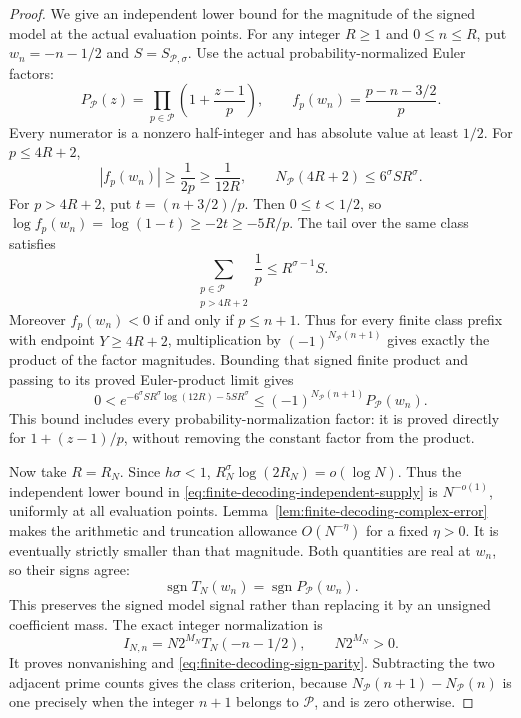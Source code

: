 \documentclass[11pt]{article}
\theoremstyle{definition}
\begin{document}
\begin{proof}
We give an independent lower bound for the magnitude of the
signed model at the actual evaluation points.
For any integer $R\ge1$ and $0\le n\le R$, put
$w_n=-n-1/2$ and $S=S_{\mathcal P,\sigma}$.
Use the actual probability-normalized Euler factors:
\[
 P_{\mathcal P}(z)=\prod_{p\in\mathcal P}
                 \left(1+\frac{z-1}{p}\right),\qquad
 f_p(w_n)=\frac{p-n-3/2}{p}.
\]
Every numerator is a nonzero half-integer and has absolute value
at least $1/2$. For $p\le4R+2$,
\[
 |f_p(w_n)|\ge\frac1{2p}\ge\frac1{12R},\qquad
 N_{\mathcal P}(4R+2)\le6^\sigma SR^\sigma .
\]
For $p>4R+2$, put $t=(n+3/2)/p$. Then $0\le t<1/2$, so
$\log f_p(w_n)=\log(1-t)\ge-2t\ge-5R/p$.
The tail over the same class satisfies
\[
 \sum_{\substack{p\in\mathcal P\\p>4R+2}}\frac1p
                            \le R^{\sigma-1}S.
\]
Moreover $f_p(w_n)<0$ if and only if $p\le n+1$.
Thus for every finite class prefix with endpoint $Y\ge4R+2$,
multiplication by $(-1)^{N_{\mathcal P}(n+1)}$ gives exactly the
product of the factor magnitudes. Bounding that signed finite
product and passing to its proved Euler-product limit gives
\begin{equation}
 0<e^{-6^\sigma SR^\sigma\log(12R)-5SR^\sigma}
 \le(-1)^{N_{\mathcal P}(n+1)}P_{\mathcal P}(w_n).
 \label{eq:finite-decoding-independent-supply}
\end{equation}
This bound includes every probability-normalization factor:
it is proved directly for $1+(z-1)/p$, without removing the
constant factor from the product.

Now take $R=R_N$.
Since $h\sigma<1$,
$R_N^\sigma\log(2R_N)=o(\log N)$.
Thus the independent lower bound in
\eqref{eq:finite-decoding-independent-supply} is $N^{-o(1)}$,
uniformly at all evaluation points.
Lemma~\ref{lem:finite-decoding-complex-error} makes the
arithmetic and truncation allowance $O(N^{-\eta})$ for a
fixed $\eta>0$.
It is eventually strictly smaller than that magnitude.
Both quantities are real at $w_n$, so their signs agree:
\[
 \operatorname{sgn}T_N(w_n)
                       =\operatorname{sgn}P_{\mathcal P}(w_n).
\]
This preserves the signed model signal rather than replacing
it by an unsigned coefficient mass.
The exact integer normalization is
\begin{equation}
             I_{N,n}=N2^{M_N}T_N(-n-1/2),
                   \qquad N2^{M_N}>0 .
 \label{eq:finite-decoding-exact-normalization}
\end{equation}
It proves nonvanishing and
\eqref{eq:finite-decoding-sign-parity}.
Subtracting the two adjacent prime counts gives the class
criterion, because
$N_{\mathcal P}(n+1)-N_{\mathcal P}(n)$ is one precisely
when the integer $n+1$ belongs to $\mathcal P$, and is zero otherwise.


\end{proof}
\end{document}

